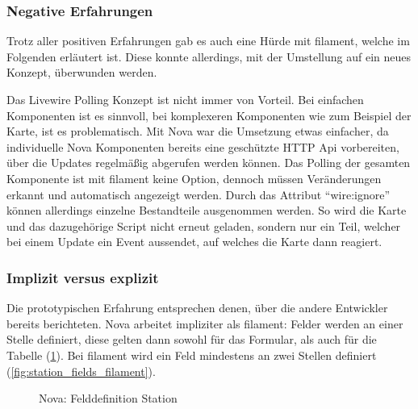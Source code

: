 \subsubsection{Negative Erfahrungen}
Trotz aller positiven Erfahrungen gab es auch eine Hürde mit filament, welche im Folgenden erläutert ist.
Diese konnte allerdings, mit der Umstellung auf ein neues Konzept, überwunden werden.

Das Livewire Polling Konzept ist nicht immer von Vorteil.
Bei einfachen Komponenten ist es sinnvoll, bei komplexeren Komponenten wie zum Beispiel der Karte, ist es problematisch.
Mit Nova war die Umsetzung etwas einfacher, da individuelle Nova Komponenten bereits eine geschützte HTTP Api vorbereiten, über die Updates regelmäßig abgerufen werden können.
Das Polling der gesamten Komponente ist mit filament keine Option, dennoch müssen Veränderungen erkannt und automatisch angezeigt werden.
Durch das Attribut \enquote{wire:ignore} können allerdings einzelne Bestandteile ausgenommen werden.
So wird die Karte und das dazugehörige Script nicht erneut geladen, sondern nur ein Teil, welcher bei einem Update ein Event aussendet, auf welches die Karte dann reagiert.

\newpage

\subsubsection{Implizit versus explizit}
Die prototypischen Erfahrung entsprechen denen, über die andere Entwickler\cite{reddit-laravel-nova-vs-filament} bereits berichteten.
Nova arbeitet impliziter als filament:
Felder werden an einer Stelle definiert, diese gelten dann sowohl für das Formular, als auch für die Tabelle (\ref{fig:station_fields_nova}).
Bei filament wird ein Feld mindestens an zwei Stellen definiert (\ref{fig:station_fields_filament}).

\begin{figure}[h!]
    \centering
    \caption{Nova: Felddefinition Station}
    \label{fig:station_fields_nova}
\end{figure}

